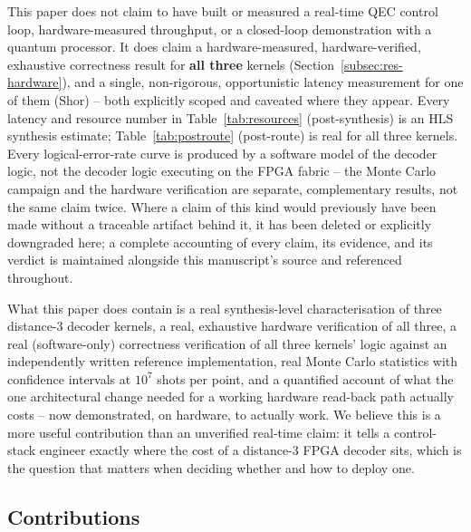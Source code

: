 This paper does not claim to have built or measured a real-time QEC control loop, hardware-measured throughput, or a closed-loop demonstration with a quantum processor. It does claim a hardware-measured, hardware-verified, exhaustive correctness result for \textbf{all three} kernels (Section~\ref{subsec:res-hardware}), and a single, non-rigorous, opportunistic latency measurement for one of them (Shor) -- both explicitly scoped and caveated where they appear. Every latency and resource number in Table~\ref{tab:resources} (post-synthesis) is an HLS synthesis estimate; Table~\ref{tab:postroute} (post-route) is real for all three kernels. Every logical-error-rate curve is produced by a software model of the decoder logic, not the decoder logic executing on the FPGA fabric -- the Monte Carlo campaign and the hardware verification are separate, complementary results, not the same claim twice. Where a claim of this kind would previously have been made without a traceable artifact behind it, it has been deleted or explicitly downgraded here; a complete accounting of every claim, its evidence, and its verdict is maintained alongside this manuscript's source and referenced throughout.

What this paper does contain is a real synthesis-level characterisation of three distance-3 decoder kernels, a real, exhaustive hardware verification of all three, a real (software-only) correctness verification of all three kernels' logic against an independently written reference implementation, real Monte Carlo statistics with confidence intervals at \(10^7\) shots per point, and a quantified account of what the one architectural change needed for a working hardware read-back path actually costs -- now demonstrated, on hardware, to actually work. We believe this is a more useful contribution than an unverified real-time claim: it tells a control-stack engineer exactly where the cost of a distance-3 FPGA decoder sits, which is the question that matters when deciding whether and how to deploy one.

\subsection{Contributions}\label{subsec:contributions}

